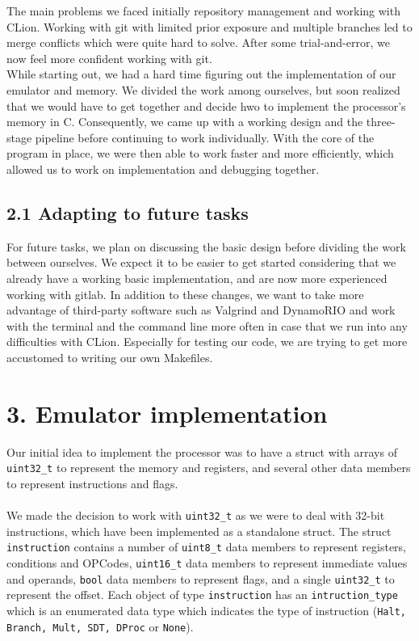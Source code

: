 \documentclass[a4paper, twoside]{report}
\begin{document}
The main problems we faced initially repository management and working with CLion. Working with git with limited prior exposure and multiple branches led to merge conflicts which were quite hard to solve. After some trial-and-error, we now feel more confident working with git. \\ 
While starting out, we had a hard time figuring out the implementation of our emulator and memory. We divided the work among ourselves, but soon realized that we would have to get together and decide hwo to implement the processor's memory in C. Consequently, we came up with a working design and the three-stage pipeline before continuing to work individually. With the core of the program in place, we were then able to work faster and more efficiently, which allowed us to work on implementation and debugging together. 
\subsection*{2.1 Adapting to future tasks}
For future tasks, we plan on discussing the basic design before dividing the work between ourselves. We expect it to be easier to get started considering that we already have a working basic implementation, and are now more experienced working with gitlab. In addition to these changes, we want to take more advantage of third-party software such as Valgrind and DynamoRIO and work with the terminal and the command line more often in case that we run into any difficulties with CLion. Especially for testing our code, we are trying to get more accustomed to writing our own Makefiles.



\section*{}

\section*{3. Emulator implementation}
Our initial idea to implement the processor was to have a struct with arrays of \verb|uint32_t| to represent the memory and registers, and several other data members to represent instructions and flags. \\ \\
We made the decision to work with \verb|uint32_t| as we were to deal with 32-bit instructions, which have been implemented as a standalone struct. The struct \verb|instruction| contains a number of \verb|uint8_t| data members to represent registers, conditions and OPCodes, \verb|uint16_t| data members to represent immediate values and operands, \verb|bool| data members to represent flags, and a single \verb|uint32_t| to represent the offset. Each object of type \verb|instruction| has an \verb|intruction_type| which is an enumerated data type which indicates the type of instruction (\verb|Halt, Branch, Mult, SDT, DProc| or \verb|None|). \\
\end{document}
